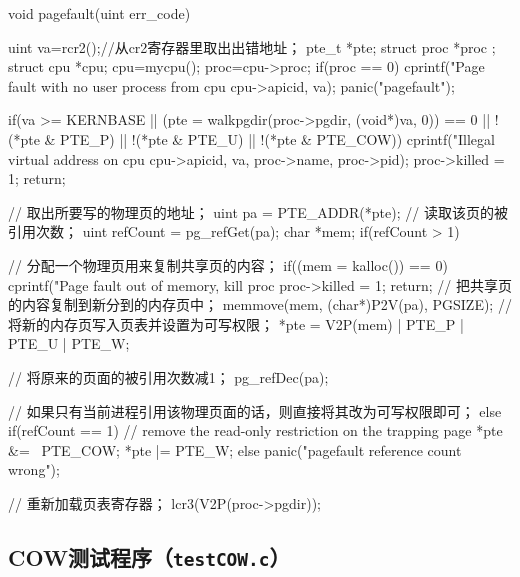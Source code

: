 \documentclass{swfcthesismscctex}
\begin{document}
\begin{ccode}
void pagefault(uint err_code)
{
  uint va=rcr2();//从cr2寄存器里取出出错地址；
  pte_t *pte;
  struct proc *proc ;
  struct cpu *cpu;
  cpu=mycpu();
  proc=cpu->proc;
  if(proc == 0){
    cprintf("Page fault with no user process from cpu %
            cpu->apicid, va);
    panic("pagefault");
  }

  if(va >= KERNBASE || (pte = walkpgdir(proc->pgdir, (void*)va, 0)) == 0  ||
     !(*pte & PTE_P) || !(*pte & PTE_U) || !(*pte & PTE_COW)){
    cprintf("Illegal virtual address on cpu %
            cpu->apicid, va, proc->name, proc->pid);
    proc->killed = 1;
    return;
  }
 
    // 取出所要写的物理页的地址；
    uint pa = PTE_ADDR(*pte);
    // 读取该页的被引用次数；
    uint refCount = pg_refGet(pa);
    char *mem;
    if(refCount > 1) {

        // 分配一个物理页用来复制共享页的内容；
        if((mem = kalloc()) == 0) {
          cprintf("Page fault out of memory, kill proc %
          proc->killed = 1;
         return;
        }
        // 把共享页的内容复制到新分到的内存页中；
        memmove(mem, (char*)P2V(pa), PGSIZE);
        // 将新的内存页写入页表并设置为可写权限；
        *pte = V2P(mem) | PTE_P | PTE_U | PTE_W;
        
        // 将原来的页面的被引用次数减1；
        pg_refDec(pa);
    }
    // 如果只有当前进程引用该物理页面的话，则直接将其改为可写权限即可；
    else if(refCount == 1){
      // remove the read-only restriction on the trapping page
      *pte &= ~PTE_COW;
      *pte |= PTE_W;
    }
    else{
      panic("pagefault reference count wrong\n");
    }

    // 重新加载页表寄存器；
    lcr3(V2P(proc->pgdir));
}
\end{ccode}

\subsection{COW测试程序（\texttt{testCOW.c}）}
\label{src:testCOW.c}
\end{document}
